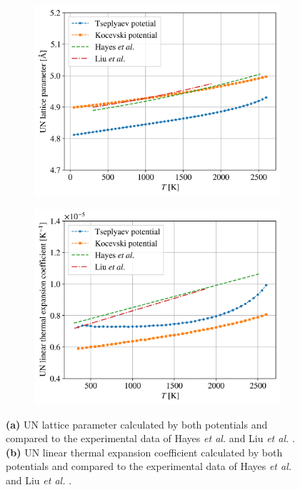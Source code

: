 \documentclass[preprint, 12pt]{elsarticle}
\begin{document}
\begin{figure}[h!]
\captionsetup{width=\textwidth}
\centering
\begin{subfigure}{0.4\textwidth}
    \includegraphics[width=\textwidth]{UNL.png}
    \caption{}
    \label{Fig:UNL}
\end{subfigure}
\begin{subfigure}{0.4\textwidth}
    \includegraphics[width=\textwidth]{UNLTEC.png}
    \caption{}
    \label{Fig:UNLTEC}
\end{subfigure}
\caption{\textbf{(a)} UN lattice parameter calculated by both potentials and compared to the experimental data of Hayes \textit{et al.} \cite{Hayes1990I} and Liu \textit{et al.} \cite{Liu2023}. \textbf{(b)} UN linear thermal expansion coefficient calculated by both potentials and compared to the experimental data of Hayes \textit{et al.} \cite{Hayes1990I} and Liu \textit{et al.} \cite{Liu2023}.}
\label{Fig:UNL-LTEC}
\end{figure}
\end{document}

